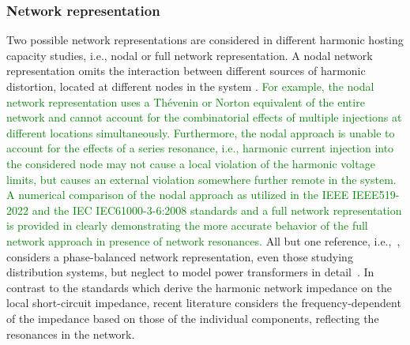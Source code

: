 \subsubsection{Network representation} 
\label{sec:network_representation} 

Two possible network representations are considered in different harmonic hosting capacity studies, i.e., nodal or full network representation. A nodal network representation omits the interaction between different sources of harmonic distortion, located at different nodes in the system \cite{van_acker_tom_impact_2025}. \textcolor{green}{For example, the nodal network representation uses a Thévenin or Norton equivalent of the entire network and cannot account for the combinatorial effects of multiple injections at different locations simultaneously. Furthermore, the nodal approach is unable to account for the effects of a series resonance, i.e., harmonic current injection into the considered node may not cause a local violation of the harmonic voltage limits, but causes an external violation somewhere further remote in the system. A numerical comparison of the nodal approach as utilized in the IEEE IEEE519-2022 and the IEC IEC61000-3-6:2008 standards and a full network representation is provided in \cite{van_acker_tom_impact_2025} clearly demonstrating the more accurate behavior of the full network approach in presence of network resonances.}  All but one reference, i.e.,~\cite{carmelito_hosting_2023}, considers a phase-balanced network representation, even those studying distribution systems, but neglect to model power transformers in detail~\cite{geth_harmonic_2022}. In contrast to the standards which derive the harmonic network impedance on the local short-circuit impedance, recent literature considers the frequency-dependent of the impedance based on those of the individual components, reflecting the resonances in the network.


